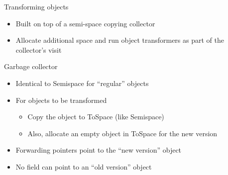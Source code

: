
\begin{frame}[t,fragile,label=transform]{Transforming objects}%
\begin{itemize}
\item Built on top of a semi-space copying collector
\item Allocate additional space and run object transformers as part of the
      collector's visit
\end{itemize}
\end{frame}

\ifdraft{}{


}

\begin{frame}[t,fragile]{\DSU{} Garbage collector}%
\begin{itemize}
\item Identical to Semispace for ``regular'' objects
\item For objects to be transformed
  \begin{itemize}
  \item Copy the object to ToSpace (like Semispace)
  \item Also, allocate an empty object in ToSpace for the new version
  \end{itemize}
\item Forwarding pointers point to the ``new version'' object
\item No field can point to an ``old version'' object
\end{itemize}
\end{frame}

